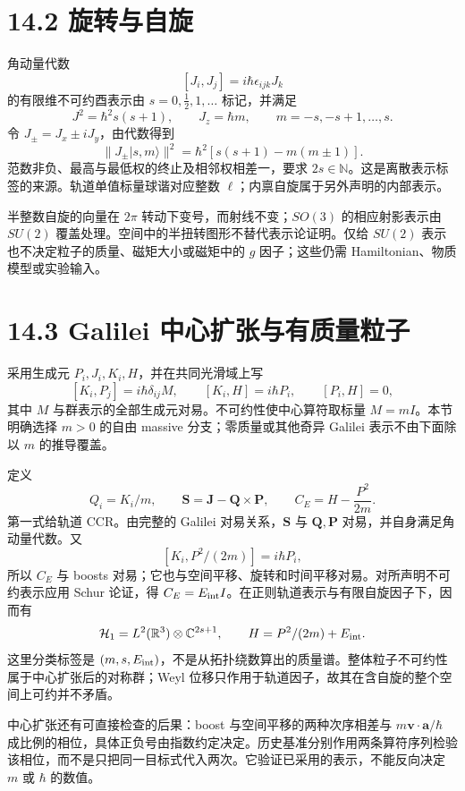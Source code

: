 \documentclass[
  11pt,
  oneside]{book}
\begin{document}
\section{14.2 旋转与自旋}

角动量代数 \[
[J_i,J_j]=i\hbar\epsilon_{ijk}J_k
\] 的有限维不可约酉表示由 \(s=0,\tfrac12,1,\ldots\) 标记，并满足 \[
J^2=\hbar^2s(s+1),\qquad J_z=\hbar m,
\qquad m=-s,-s+1,\ldots,s.
\] 令 \(J_\pm=J_x\pm iJ_y\)，由代数得到 \[
\|J_\pm|s,m\rangle\|^2
=\hbar^2[s(s+1)-m(m\pm1)].
\] 范数非负、最高与最低权的终止及相邻权相差一，要求
\(2s\in\mathbb N\)。这是离散表示标签的来源。轨道单值标量球谐对应整数
\(\ell\)；内禀自旋属于另外声明的内部表示。

半整数自旋的向量在 \(2\pi\) 转动下变号，而射线不变；\(SO(3)\)
的相应射影表示由 \(SU(2)\)
覆盖处理。空间中的半扭转图形不替代表示论证明。仅给 \(SU(2)\)
表示也不决定粒子的质量、磁矩大小或磁矩中的 \(g\) 因子；这些仍需
Hamiltonian、物质模型或实验输入。

\section{14.3 Galilei 中心扩张与有质量粒子}

采用生成元 \(P_i,J_i,K_i,H\)，并在共同光滑域上写 \[
[K_i,P_j]=i\hbar\delta_{ij}M,\qquad
[K_i,H]=i\hbar P_i,\qquad [P_i,H]=0,
\] 其中 \(M\) 与群表示的全部生成元对易。不可约性使中心算符取标量
\(M=mI\)。本节明确选择 \(m>0\) 的自由 massive 分支；零质量或其他奇异
Galilei 表示不由下面除以 \(m\) 的推导覆盖。

定义 \[
Q_i=K_i/m,\qquad
\mathbf S=\mathbf J-\mathbf Q\times\mathbf P,
\qquad C_E=H-\frac{P^2}{2m}.
\] 第一式给轨道 CCR。由完整的 Galilei 对易关系，\(\mathbf S\) 与
\(\mathbf Q,\mathbf P\) 对易，并自身满足角动量代数。又 \[
[K_i,P^2/(2m)]=i\hbar P_i,
\] 所以 \(C_E\) 与 boosts
对易；它也与空间平移、旋转和时间平移对易。对所声明不可约表示应用 Schur
论证，得 \(C_E=E_{\rm int}I\)。在正则轨道表示与有限自旋因子下，因而有 \[
\mathcal H_1=L^2(\mathbb R^3)\otimes\mathbb C^{2s+1},\qquad
H=P^2/(2m)+E_{\rm int}.
\] 这里分类标签是
\((m,s,E_{\rm int})\)，不是从拓扑绕数算出的质量谱。整体粒子不可约性属于中心扩张后的对称群；Weyl
位移只作用于轨道因子，故其在含自旋的整个空间上可约并不矛盾。

中心扩张还有可直接检查的后果：boost 与空间平移的两种次序相差与
\(m\mathbf v\cdot\mathbf a/\hbar\)
成比例的相位，具体正负号由指数约定决定。历史基准分别作用两条算符序列检验该相位，而不是只把同一目标式代入两次。它验证已采用的表示，不能反向决定
\(m\) 或 \(\hbar\) 的数值。
\end{document}
